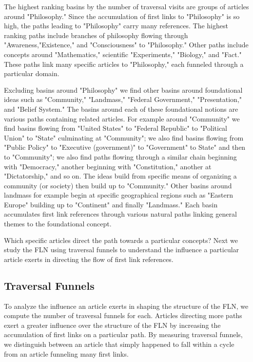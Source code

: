 \documentclass[pre,twocolumn,twoside,superscriptaddress,floatfix, aps, 10pt]{revtex4-1}
\begin{document}
The highest ranking basins by the number of traversal visits are groups of articles
around "Philosophy." 
Since the accumulation of first links to "Philosophy" is so high, 
the paths leading to "Philosophy" carry many references.
The highest ranking paths include branches of philosophy flowing through 
"Awareness,"Existence," and "Consciousness" to "Philosophy." Other paths
include concepts around "Mathematics," scientific "Experiments," 
"Biology," and "Fact."
These paths link many specific articles to "Philosophy," each funneled through a particular domain.

Excluding basins around "Philosophy" we find other basins around 
foundational ideas such as "Community," "Landmass," "Federal Government," 
"Presentation," and "Belief System." 
The basins around each of these foundational notions are 
various paths containing related articles. For example around 
"Community" we find basins
flowing from "United States" to "Federal Republic" to "Political Union" to "State" culminating at "Community"; we also find basins flowing from 
"Public Policy" to "Executive (government)" to "Government" to State" and then 
to "Community"; we also find paths flowing through a similar chain beginning
with "Democracy," another beginning with "Constitution," another at 
"Dictatorship," and so on. The ideas build from specific means of organizing
a community (or society) then build up to "Community." 
Other basins around landmass for example begin at specific geographical regions
such as "Eastern Europe" building up to "Continent" and finally "Landmass."
Each basin accumulates first link references through various 
natural paths linking general themes to the foundational concept.

Which specific articles direct the path towards a particular concepts? 
Next we study the FLN using traversal funnels to understand the influence
a particular article exerts in directing the flow of first link references.



\subsection{Traversal Funnels}

To analyze the influence an article exerts in shaping the 
structure of the FLN, we compute the number of traversal funnels for each.
Articles directing more paths exert a greater influence over the structure
of the FLN by increasing the accumulation of first links
on a particular path. By measuring traversal funnels, we distinguish between an article that simply happened to fall within a cycle from an article funneling 
many first links.
\end{document}
